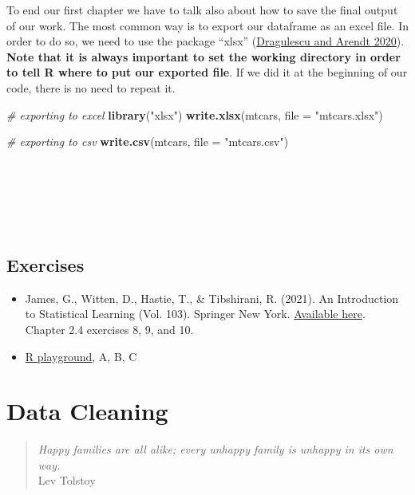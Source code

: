 \documentclass[
]{svmono}
\newenvironment{Shaded}{\begin{snugshade}}{\end{snugshade}}
\newcommand{\AttributeTok}[1]{\textcolor[rgb]{0.13,0.29,0.53}{#1}}
\newcommand{\CommentTok}[1]{\textcolor[rgb]{0.56,0.35,0.01}{\textit{#1}}}
\newcommand{\FunctionTok}[1]{\textcolor[rgb]{0.13,0.29,0.53}{\textbf{#1}}}
\newcommand{\NormalTok}[1]{#1}
\newcommand{\StringTok}[1]{\textcolor[rgb]{0.31,0.60,0.02}{#1}}
\providecommand{\tightlist}{%
  \setlength{\itemsep}{0pt}\setlength{\parskip}{0pt}}
\begin{document}
To end our first chapter we have to talk also about how to save the
final output of our work. The most common way is to export our dataframe
as an excel file. In order to do so, we need to use the package
``xlsx'' (\protect\hyperlink{ref-dragulescu2020}{Dragulescu and Arendt 2020}). \textbf{Note that it is always important to set the
working directory in order to tell R where to put our exported file}.
If we did it at the beginning of our code, there is no need to repeat
it.

\begin{Shaded}
\begin{Highlighting}[]
\CommentTok{\# exporting to excel}
\FunctionTok{library}\NormalTok{(}\StringTok{"xlsx"}\NormalTok{)}
\FunctionTok{write.xlsx}\NormalTok{(mtcars, }\AttributeTok{file =} \StringTok{"mtcars.xlsx"}\NormalTok{)}

\CommentTok{\# exporting to csv}
\FunctionTok{write.csv}\NormalTok{(mtcars, }\AttributeTok{file =} \StringTok{"mtcars.csv"}\NormalTok{)}
\end{Highlighting}
\end{Shaded}

~

~

~

\hypertarget{exercises}{%
\section{Exercises}\label{exercises}}

\begin{itemize}
\tightlist
\item
  James, G., Witten, D., Hastie, T., \& Tibshirani, R. (2021). An
  Introduction to Statistical Learning (Vol. 103). Springer New York.
  \href{https://www.statlearning.com}{Available here}. Chapter 2.4 exercises 8, 9, and 10.
\item
  \href{https://federicoroscioli.shinyapps.io/exercises/}{R playground}, A, B, C
\end{itemize}

\newpage

\hypertarget{data-cleaning}{%
\chapter{Data Cleaning}\label{data-cleaning}}

\begin{quote}
\emph{Happy families are all alike; every unhappy family is unhappy in its
own way.}\\
Lev Tolstoy
\end{quote}
\end{document}
